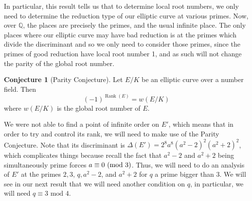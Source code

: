 \documentclass{article}
\newcommand{\Q}{\mathbb{Q}}
\theoremstyle{definition}
\newtheorem{conj}{Conjecture}
\DeclareMathOperator{\Rank}{Rank}
\begin{document}
\noindent In particular, this result tells us that to determine local root numbers, we only need to determine the reduction type of our elliptic curve at various primes. Now, over $\Q$, the places are precisely the primes, and the usual infinite place. The only places where our elliptic curve may have bad reduction is at the primes which divide the discriminant and so we only need to consider those primes, since the primes of good reduction have local root number 1, and as such will not change the parity of the global root number.
\begin{conj}[Parity Conjecture] \label{parityconjecture}
    Let $E/K$ be an elliptic curve over a number field. Then 
    $$(-1)^{\Rank(E)} = w(E/K)$$
    where $w(E/K)$ is the global root number of $E$.
\end{conj}

\noindent We were not able to find a point of infinite order on $E'$, which means that in order to try and control its rank, we will need to make use of the Parity Conjecture. Note that its discriminant is $\Delta(E') = 2^8 a^8 (a^2 - 2)^2 (a^2 + 2)^2$, which complicates things because recall the fact that $a^2-2$ and $a^2+2$ being simultaneously prime forces $a \equiv 0 \textnormal{ (mod }3)$. Thus, we will need to do an analysis of $E'$ at the primes $2, 3$, $q, a^2 - 2$, and  $a^2 + 2$ for $q$ a prime bigger than 3. We will see in our next result that we will need another condition on $q$, in particular, we will need $q \equiv 3 \text{ mod } 4$.
\end{document}
